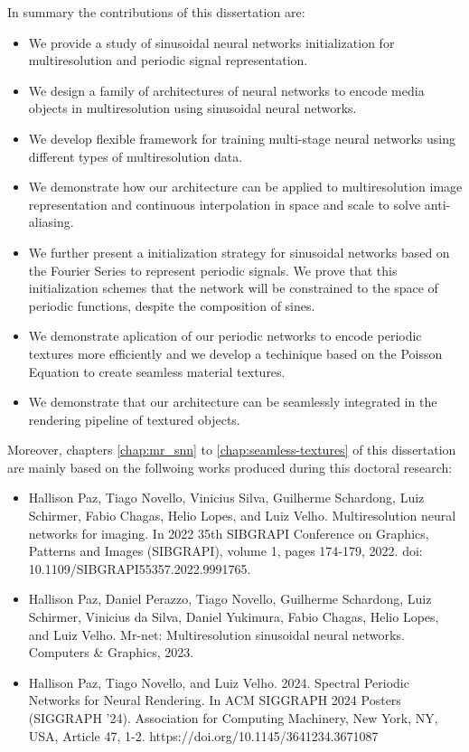 In summary the contributions of this dissertation are:

\begin{itemize}
    \item We provide a study of sinusoidal neural networks initialization for multiresolution and periodic signal representation.
    \item We design a family of architectures of neural networks to encode media objects in multiresolution using sinusoidal neural networks.
    \item We develop flexible framework for training multi-stage neural networks using different types of multiresolution data.
    \item We demonstrate how our architecture can be applied to multiresolution image representation and continuous interpolation in space and scale to solve anti-aliasing.
    \item We further present a initialization strategy for sinusoidal networks based on the Fourier Series to represent periodic signals. We prove that this initialization schemes that the network will be constrained to the space of periodic functions, despite the composition of sines. 
    \item We demonstrate aplication of our periodic networks to encode periodic textures more efficiently and we develop a techinique based on the Poisson Equation to create seamless material textures.
    \item We demonstrate that our architecture can be seamlessly integrated in the  rendering pipeline of textured objects.
\end{itemize}

Moreover, chapters \ref{chap:mr_snn} to \ref{chap:seamless-textures} of this dissertation are mainly based on the follwoing works produced during this doctoral research:

\begin{itemize}
    \item Hallison Paz, Tiago Novello, Vinicius Silva, Guilherme Schardong, Luiz Schirmer, Fabio Chagas, Helio Lopes, and Luiz Velho. Multiresolution neural networks for imaging. In 2022 35th SIBGRAPI Conference on Graphics, Patterns and Images (SIBGRAPI), volume 1, pages 174-179, 2022. doi: 10.1109/SIBGRAPI55357.2022.9991765.
    \item Hallison Paz, Daniel Perazzo, Tiago Novello, Guilherme Schardong, Luiz Schirmer, Vinicius da Silva, Daniel Yukimura, Fabio Chagas, Helio Lopes, and Luiz Velho. Mr-net: Multiresolution sinusoidal neural networks. Computers \& Graphics, 2023.
    \item Hallison Paz, Tiago Novello, and Luiz Velho. 2024. Spectral Periodic Networks for Neural Rendering. In ACM SIGGRAPH 2024 Posters (SIGGRAPH '24). Association for Computing Machinery, New York, NY, USA, Article 47, 1-2. https://doi.org/10.1145/3641234.3671087
\end{itemize}


